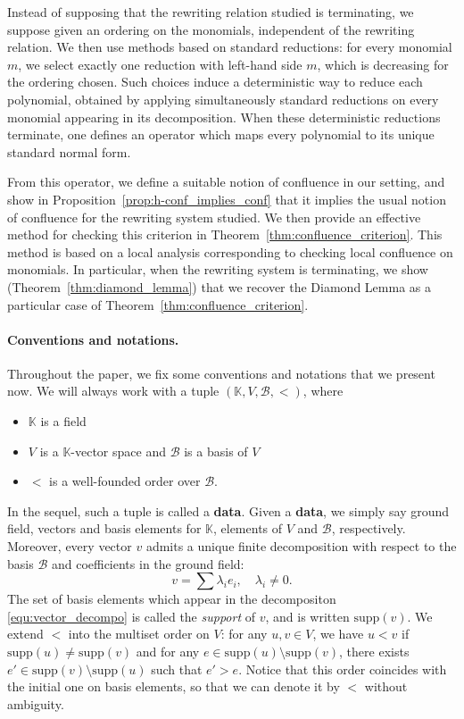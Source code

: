 \documentclass[10pt]{easychair}
\theoremstyle{definition}
\newcommand\data{{\color{red}\bf data}}
\newcommand\supp{\text{supp}}
\newcommand\basis{\mathscr{B}}
\newcommand\K{\mathbb{K}}
\begin{document}
Instead of supposing that the rewriting relation studied is
terminating, we suppose given an ordering on the monomials,
independent of the rewriting relation.  We then use methods based on
standard reductions: for every monomial $m$, we select exactly one
reduction with left-hand side $m$, which is decreasing for the
ordering chosen. Such choices induce a deterministic way to reduce
each polynomial, obtained by applying simultaneously standard
reductions on every monomial appearing in its decomposition. When
these deterministic reductions terminate, one defines an operator
which maps every polynomial to its unique standard normal form.

From this operator, we define a suitable notion of confluence in
our setting, and show in Proposition~\ref{prop:h-conf_implies_conf}
that it implies the usual notion of confluence for the rewriting
system studied. We then provide an effective method for checking this
criterion in Theorem~\ref{thm:confluence_criterion}. This method is
based on a local analysis corresponding to checking local confluence
on monomials. In particular, when the rewriting system is terminating,
we show (Theorem~\ref{thm:diamond_lemma}) that we recover the Diamond
Lemma as a particular case of Theorem~\ref{thm:confluence_criterion}.

\paragraph{Conventions and notations.}

Throughout the paper, we fix some conventions and notations that we
present now. We will always work with a tuple  $(\K,V,\basis,<)$, where
\begin{itemize}
\item $\K$ is a field
\item $V$ is a $\K$-vector space and $\basis$ is a basis of $V$
\item $<$ is a well-founded order over $\basis$.
\end{itemize}
In the sequel, such a tuple is called a \data. Given a \data, we simply
say ground field, vectors and basis elements for $\K$, elements of $V$
and $\basis$, respectively. Moreover, every vector $v$ admits a unique
finite decomposition with respect to the basis $\basis$ and coefficients
in the ground field:
\begin{equation}\label{equ:vector_decompo}
  v=\sum\lambda_ie_i,\quad\lambda_i\neq 0.
\end{equation}
The set of basis elements which appear in the decompositon
\eqref{equ:vector_decompo} is called the {\it support} of $v$, and is
written $\supp(v)$. We extend $<$ into the multiset order on $V$: for any
$u,v \in V$, we have $u<v$ if $\supp(u)\neq\supp(v)$ and for any
$e\in\supp(u)\setminus\supp(v)$, there exists
$e'\in\supp(v)\setminus\supp(u)$ such that $e'>e$. Notice that this order
coincides with the initial one on basis elements, so that we can denote
it by $<$ without ambiguity.
\end{document}
